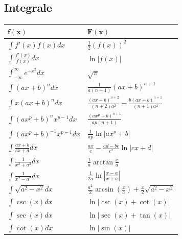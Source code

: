 \documentclass[a4paper,10pt]{article}
\begin{document}
\subsection{Integrale}
\begin{center}
	\begin{tabularx}{\linewidth}{>{\centering\arraybackslash}X>{\centering\arraybackslash}X}
		\toprule
		$\mathbf{f(x)}$                     & $\mathbf{F(x)}$                                                     \\
		\midrule
		$\int f'(x) f(x) dx$                & $\frac{1}{2}(f(x))^2$                                               \\
		$\int \frac{f'(x)}{f(x)} dx$        & $\ln|f(x)|$                                                         \\
		$\int_{-\infty}^\infty e^{-x^2} dx$ & $\sqrt{\pi}$                                                        \\
		$\int (ax+b)^n dx$                  & $\frac{1}{a(n+1)}(ax+b)^{n+1}$                                      \\
		$\int x(ax+b)^n dx$                 & $\frac{(ax+b)^{n+2}}{(n+2)a^2} - \frac{b(ax+b)^{n+1}}{(n+1)a^2}$    \\
		$\int (ax^p+b)^n x^{p-1} dx$        & $\frac{(ax^p+b)^{n+1}}{ap(n+1)}$                                    \\
		$\int (ax^p + b)^{-1} x^{p-1} dx$   & $\frac{1}{ap} \ln |ax^p + b|$                                       \\
		$\int \frac{ax+b}{cx+d} dx$         & $\frac{ax}{c} - \frac{ad-bc}{c^2} \ln |cx +d|$                      \\
		$\int \frac{1}{x^2+a^2} dx$         & $\frac{1}{a} \arctan \frac{x}{a}$                                   \\
		$\int \frac{1}{x^2 - a^2} dx$       & $\frac{1}{2a} \ln\left| \frac{x-a}{x+a} \right|$                    \\
		$\int \sqrt{a^2 - x^2} dx $         & $\frac{a^2}{2} \arcsin(\frac{x}{a}) + \frac{x}{2} \sqrt{a^2 - x^2}$ \\
		$\int \csc(x) dx $                  & $\ln|\csc(x) + \cot(x)|$                                            \\
		$\int \sec(x) dx $                  & $\ln|\sec(x) + \tan(x)|$                                            \\
		$\int \cot(x) dx $                  & $\ln|\sin(x)|$                                                      \\

\end{tabularx}
\end{center}
\end{document}

